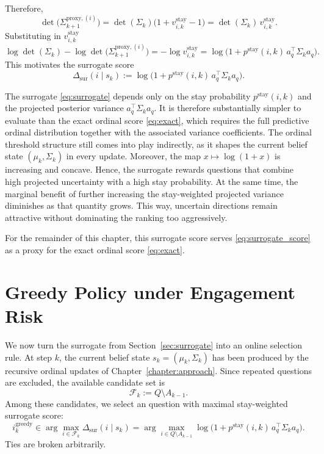 \documentclass{article}
\begin{document}
Therefore,
\begin{equation*}
\det\!\bigl(\Sigma_{k+1}^{\text{proxy},(i)}\bigr)
=
\det(\Sigma_k)\bigl(1+v_{i,k}^{\text{stay}}-1\bigr)
=
\det(\Sigma_k)\,v_{i,k}^{\text{stay}}.
\end{equation*}
Substituting in $v_{i,k}^{\text{stay}}$
\begin{equation*}
\log\det(\Sigma_k)-\log\det\!\bigl(\Sigma_{k+1}^{\text{proxy},(i)}\bigr)
=
-\log v_{i,k}^{\text{stay}}
=
\log\!\bigl(1+p^{\text{stay}}(i,k)\,a_q^\top\Sigma_k a_q\bigr).
\end{equation*}
This motivates the surrogate score
\begin{equation*}
\Delta_{\text{sur}}(i\mid s_k)
:=
\log\!\bigl(1+p^{\text{stay}}(i,k)\,a_q^\top\Sigma_k a_q\bigr).
\label{eq:surrogate}
\end{equation*}



The surrogate \eqref{eq:surrogate} depends only on the stay probability
$p^{\text{stay}}(i,k)$ and the projected posterior variance $a_q^\top \Sigma_k a_q$. It is therefore substantially simpler to evaluate than the exact ordinal score
\eqref{eq:exact}, which requires the full predictive ordinal distribution together
with the associated variance coefficients. The ordinal
threshold structure still comes into play indirectly, as it shapes the current belief
state $(\mu_k,\Sigma_k)$ in every update. 
Moreover, the map $x \mapsto \log(1+x)$ is increasing and concave. Hence, the
surrogate rewards questions that combine high projected uncertainty with a high
stay probability. At the same time, the marginal
benefit of further increasing the stay-weighted projected variance diminishes as that
quantity grows. This way, uncertain directions remain attractive
without dominating the ranking too aggressively.

For the remainder of this chapter, this surrogate score serves \eqref{eq:surrogate_score} as a
proxy for the exact ordinal score \eqref{eq:exact}.



\section{Greedy Policy under Engagement Risk}\label{sec:greedy}
We now turn the surrogate from Section~\ref{sec:surrogate} into an online selection rule. At step $k$, the current belief
state $s_k=(\mu_k,\Sigma_k)$ has been produced by the recursive ordinal updates of
Chapter~\ref{chapter:approach}. 
Since repeated
questions are excluded, the available candidate set is
\begin{equation*}
\mathcal F_k := Q\setminus A_{k-1}.
\end{equation*}
Among these candidates, we select an question with maximal stay-weighted surrogate
score:
\begin{equation*}
i_k^{\text{greedy}}
\in
\arg\max_{i\in \mathcal F_k}
\Delta_{\text{sur}}(i\mid s_k)
=
\arg\max_{i\in Q\setminus A_{k-1}}
\log\!\bigl(1+p^{\text{stay}}(i,k)\,a_q^\top \Sigma_k a_q\bigr).
\label{eq:greedy}
\end{equation*}
Ties are broken arbitrarily.
\end{document}
